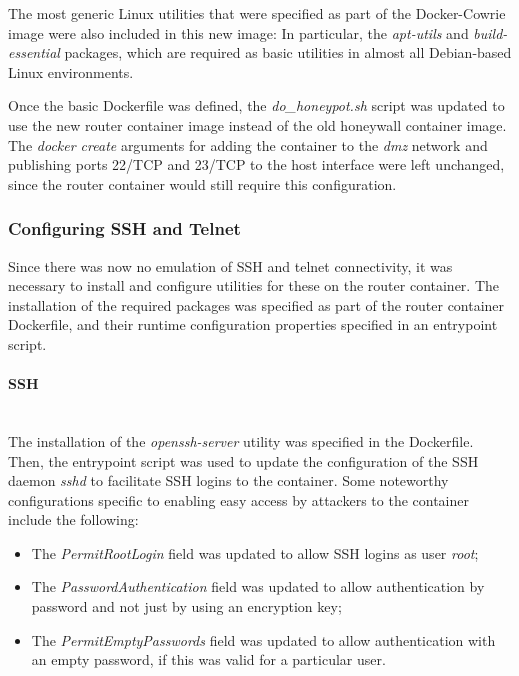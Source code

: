 The most generic Linux utilities that were specified as part of the Docker-Cowrie image were also included in this new image: In particular, the \textit{apt-utils} and \textit{build-essential} packages, which are required as basic utilities in almost all Debian-based Linux environments.

Once the basic Dockerfile was defined, the \textit{do\_honeypot.sh} script was updated to use the new router container image instead of the old honeywall container image. The \textit{docker create} arguments for adding the container to the \textit{dmz} network and publishing ports 22/TCP and 23/TCP to the host interface were left unchanged, since the router container would still require this configuration.

\subsubsection{Configuring SSH and Telnet}
Since there was now no emulation of SSH and telnet connectivity, it was necessary to install and configure utilities for these on the router container. The installation of the required packages was specified as part of the router container Dockerfile, and their runtime configuration properties specified in an entrypoint script.

\paragraph{SSH}\mbox{}\\
The installation of the \textit{openssh-server} utility was specified in the Dockerfile. Then, the entrypoint script was used to update the configuration of the SSH daemon \textit{sshd} to facilitate SSH logins to the container. Some noteworthy configurations specific to enabling easy access by attackers to the container include the following:

\begin{itemize}
    \item The \textit{PermitRootLogin} field was updated to allow SSH logins as user \textit{root};
    \item The \textit{PasswordAuthentication} field was updated to allow authentication by password and not just by using an encryption key;
    \item The \textit{PermitEmptyPasswords} field was updated to allow authentication with an empty password, if this was valid for a particular user.
\end{itemize}

